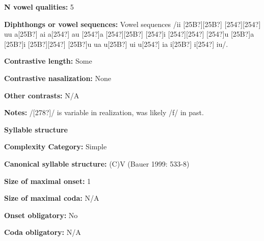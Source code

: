 \begin{styleBody}
\textbf{N vowel qualities:} 5
\end{styleBody}

\begin{styleBody}
\textbf{Diphthongs or vowel sequences:} Vowel sequences /ii [25B?][25B?] [254?][254?] uu a[25B?] ai a[254?] au [254?]a [254?][25B?] [254?]i [254?][254?] [254?]u [25B?]a [25B?]i [25B?][254?] [25B?]u ua u[25B?] ui u[254?] ia i[25B?] i[254?] iu/.
\end{styleBody}

\begin{styleBody}
\textbf{Contrastive length:} Some
\end{styleBody}

\begin{styleBody}
\textbf{Contrastive nasalization:} None
\end{styleBody}

\begin{styleBody}
\textbf{Other contrasts:} N/A
\end{styleBody}

\begin{styleBody}
\textbf{Notes:} /[278?]/ is variable in realization, was likely /f/ in past.
\end{styleBody}

\begin{styleBody}
\textbf{Syllable structure}
\end{styleBody}

\begin{styleBody}
\textbf{Complexity Category:} Simple
\end{styleBody}

\begin{styleBody}
\textbf{Canonical syllable structure:} (C)V\textbf{ }(Bauer 1999: 533-8)
\end{styleBody}

\begin{styleBody}
\textbf{Size of maximal onset:} 1
\end{styleBody}

\begin{styleBody}
\textbf{Size of maximal coda:} N/A
\end{styleBody}

\begin{styleBody}
\textbf{Onset obligatory:} No
\end{styleBody}

\begin{styleBody}
\textbf{Coda obligatory:} N/A
\end{styleBody}

